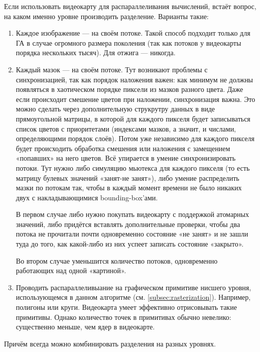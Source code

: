 Если использовать видеокарту для распараллеливания вычислений, встаёт вопрос, на каком именно уровне производить разделение.
Варианты такие:
\begin{enumerate}
    \item Каждое изображение — на своём потоке.
    Такой способ подходит только для ГА в случае огромного размера поколения (так как потоков у видеокарты порядка нескольких тысяч).
    Для отжига — никогда.

    \item Каждый мазок — на своём потоке.
                Тут возникают проблемы с синхронизацией, так как порядок наложения важен: как минимум не должны появляться в хаотическом порядке пиксели из мазков разного цвета.
                Даже если происходит смешение цветов при наложении, синхронизация важна.
                Это можно сделать через дополнительную струкрутру данных в виде прямоугольной матрицы, в которой для каждого пикселя будет записываться список цветов с приоритетами
                (индексами мазков, а значит, и числами, определяющими порядок слоёв).
                Потом уже независимо для каждого пикселя будет происходить обработка смешения или наложения с замещением «попавших» на него цветов.
                Всё упирается в умение синхронизировать потоки.
                Тут нужно либо симуляцию мьютекса для каждого пикселя (то есть матрицу булевых значений «занят-не занят»),
                либо умение распределить мазки по потокам так, чтобы в каждый момент времени не было никаких двух с накладывающимися bounding-box'ами.

                В первом случае либо нужно покупать видеокарту с поддержкой атомарных значений, либо придётся вставлять дополнительные проверки,
                чтобы два потока не прочитали почти одновременно состояние «не занят»  и не зашли туда до того, как какой-либо из них успеет записать состояние «закрыто».

                Во втором случае уменьшится количество потоков, одновременно работающих над одной «картиной».


    \item Проводить распараллеливыание на графическом примитиве нисшего уровня, использующемся в данном алгоритме (см. \ref{subsec:rasterization}).
                Например, полигоны или круги.
                Видеокарта умеет эффективно отрисовывать такие примитивы.
                Однако количество точек в примитивах обычно невелико: существенно меньше, чем ядер в видеокарте.
\end{enumerate}
Причём всегда можно комбинировать разделения на разных уровнях.

